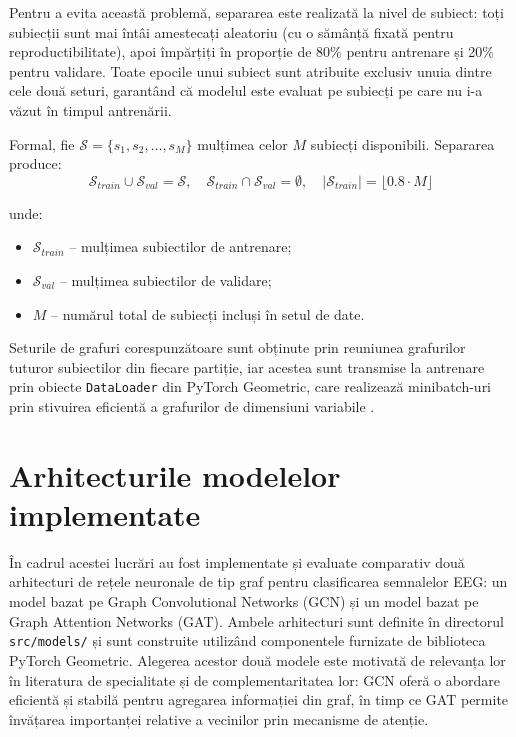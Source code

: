 \documentclass[12pt,a4paper]{report}
\theoremstyle{definition}
\theoremstyle{remark}
\begin{document}
Pentru a evita această problemă, separarea este realizată la nivel de subiect: toți subiecții sunt mai întâi amestecați aleatoriu (cu o sămânță fixată pentru reproductibilitate), apoi împărțiți în proporție de 80\% pentru antrenare și 20\% pentru validare. Toate epocile unui subiect sunt atribuite exclusiv unuia dintre cele două seturi, garantând că modelul este evaluat pe subiecți pe care nu i-a văzut în timpul antrenării.

Formal, fie $\mathcal{S} = \{s_1, s_2, \ldots, s_M\}$ mulțimea celor $M$ subiecți disponibili. Separarea produce:
\begin{equation}
    \mathcal{S}_{train} \cup \mathcal{S}_{val} = \mathcal{S}, \quad
    \mathcal{S}_{train} \cap \mathcal{S}_{val} = \emptyset, \quad
    |\mathcal{S}_{train}| = \lfloor 0.8 \cdot M \rfloor
    \label{eq:subject_split}
\end{equation}

\noindent unde:
\begin{itemize}
    \item $\mathcal{S}_{train}$ -- mulțimea subiectilor de antrenare;
    \item $\mathcal{S}_{val}$ -- mulțimea subiectilor de validare;
    \item $M$ -- numărul total de subiecți incluși în setul de date.
\end{itemize}

Seturile de grafuri corespunzătoare sunt obținute prin reuniunea grafurilor tuturor subiectilor din fiecare partiție, iar acestea sunt transmise la antrenare prin obiecte \texttt{DataLoader} din PyTorch Geometric, care realizează minibatch-uri prin stivuirea eficientă a grafurilor de dimensiuni variabile \cite{fey2019fast}.

\section{Arhitecturile modelelor implementate}

În cadrul acestei lucrări au fost implementate și evaluate comparativ două arhitecturi de rețele neuronale de tip graf pentru clasificarea semnalelor EEG: un model bazat pe Graph Convolutional Networks (GCN) și un model bazat pe Graph Attention Networks (GAT). Ambele arhitecturi sunt definite în directorul \texttt{src/models/} și sunt construite utilizând componentele furnizate de biblioteca PyTorch Geometric. Alegerea acestor două modele este motivată de relevanța lor în literatura de specialitate și de complementaritatea lor: GCN oferă o abordare eficientă și stabilă pentru agregarea informației din graf, în timp ce GAT permite învățarea importanței relative a vecinilor prin mecanisme de atenție.
\end{document}

